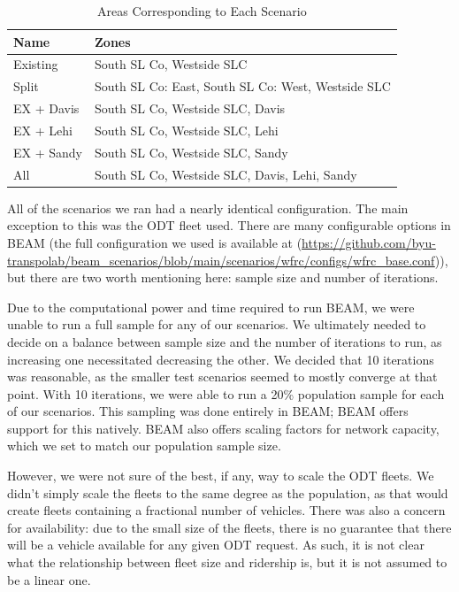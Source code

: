 \documentclass[
]{report}
\begin{document}
\begin{table}

\caption{\label{tab:scenarios-info}Areas Corresponding to Each Scenario}
\centering
\begin{tabular}[t]{ll}
\toprule
Name & Zones\\
\midrule
Existing & South SL Co, Westside SLC\\
Split & South SL Co: East, South SL Co: West, Westside SLC\\
EX + Davis & South SL Co, Westside SLC, Davis\\
EX + Lehi & South SL Co, Westside SLC, Lehi\\
EX + Sandy & South SL Co, Westside SLC, Sandy\\
All & South SL Co, Westside SLC, Davis, Lehi, Sandy\\
\bottomrule
\end{tabular}
\end{table}

All of the scenarios we ran had a nearly identical configuration. The main exception to this was the ODT fleet used. There are many configurable options in BEAM (the full configuration we used is available at (\url{https://github.com/byu-transpolab/beam_scenarios/blob/main/scenarios/wfrc/configs/wfrc_base.conf})), but there are two worth mentioning here: sample size and number of iterations.

Due to the computational power and time required to run BEAM, we were unable to run a full sample for any of our scenarios. We ultimately needed to decide on a balance between sample size and the number of iterations to run, as increasing one necessitated decreasing the other. We decided that 10 iterations was reasonable, as the smaller test scenarios seemed to mostly converge at that point. With 10 iterations, we were able to run a 20\% population sample for each of our scenarios. This sampling was done entirely in BEAM; BEAM offers support for this natively. BEAM also offers scaling factors for network capacity, which we set to match our population sample size.

However, we were not sure of the best, if any, way to scale the ODT fleets. We didn't simply scale the fleets to the same degree as the population, as that would create fleets containing a fractional number of vehicles. There was also a concern for availability: due to the small size of the fleets, there is no guarantee that there will be a vehicle available for any given ODT request. As such, it is not clear what the relationship between fleet size and ridership is, but it is not assumed to be a linear one.
\end{document}
